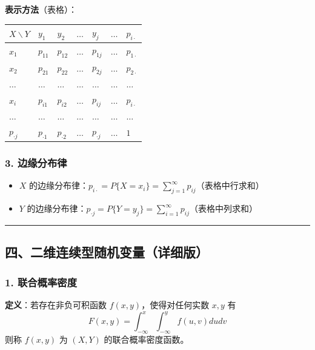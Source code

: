 \documentclass[12pt,a4paper]{ctexart}
\begin{document}
\textbf{表示方法}（表格）：

\begin{center}
    \begin{tabular}{@{}lllllll@{}}
        \toprule
        $X \backslash Y$ & $y_1$         & $y_2$         & $\dots$ & $y_j$         & $\dots$ & $p_{i\cdot}$ \\ \midrule
        $x_1$            & $p_{11}$      & $p_{12}$      & $\dots$ & $p_{1j}$      & $\dots$ & $p_{1\cdot}$ \\
        $x_2$            & $p_{21}$      & $p_{22}$      & $\dots$ & $p_{2j}$      & $\dots$ & $p_{2\cdot}$ \\
        $\dots$          & $\dots$       & $\dots$       & $\dots$ & $\dots$       & $\dots$ & $\dots$      \\
        $x_i$            & $p_{i1}$      & $p_{i2}$      & $\dots$ & $p_{ij}$      & $\dots$ & $p_{i\cdot}$ \\
        $\dots$          & $\dots$       & $\dots$       & $\dots$ & $\dots$       & $\dots$ & $\dots$      \\
        $p_{\cdot j}$    & $p_{\cdot 1}$ & $p_{\cdot 2}$ & $\dots$ & $p_{\cdot j}$ & $\dots$ & $1$          \\ \bottomrule
    \end{tabular}
\end{center}

\subsubsection{3. 边缘分布律}
\begin{itemize}[noitemsep]
    \item $X$ 的边缘分布律：$p_{i\cdot} = P\{X = x_i\} = \sum_{j=1}^\infty p_{ij}$（表格中行求和）
    \item $Y$ 的边缘分布律：$p_{\cdot j} = P\{Y = y_j\} = \sum_{i=1}^\infty p_{ij}$（表格中列求和）
\end{itemize}

\vspace{1em}\hrule\vspace{1em}

\subsection{四、二维连续型随机变量（详细版）}

\subsubsection{1. 联合概率密度}
\textbf{定义}：若存在非负可积函数 $f(x, y)$，使得对任何实数 $x, y$ 有
\[ F(x, y) = \int_{-\infty}^x \int_{-\infty}^y f(u, v) du dv \]
则称 $f(x, y)$ 为 $(X, Y)$ 的联合概率密度函数。
\end{document}
